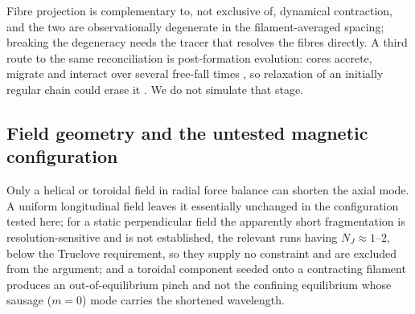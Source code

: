 \documentclass[usenatbib,twoside,twocolumn]{mnras}
\begin{document}
Fibre projection is complementary to, not exclusive of, dynamical contraction, and the two are observationally degenerate in the filament-averaged spacing; breaking the degeneracy needs the tracer that resolves the fibres directly. A third route to the same reconciliation is post-formation evolution: cores accrete, migrate and interact over several free-fall times \citep{Kirk2016,Mattern2018}, so relaxation of an initially regular chain could erase it \citep{Clarke2020}. We do not simulate that stage.

\subsection{Field geometry and the untested magnetic configuration}
\label{sec:optional_tests}

Only a helical or toroidal field in radial force balance can shorten the axial mode. A uniform longitudinal field leaves it essentially unchanged in the configuration tested here; for a static perpendicular field the apparently short fragmentation is resolution-sensitive and is not established, the relevant runs having $N_J\approx1$--$2$, below the Truelove requirement, so they supply no constraint and are excluded from the argument; and a toroidal component seeded onto a contracting filament produces an out-of-equilibrium pinch  and not the confining equilibrium whose sausage ($m=0$) mode carries the shortened wavelength.
\end{document}
